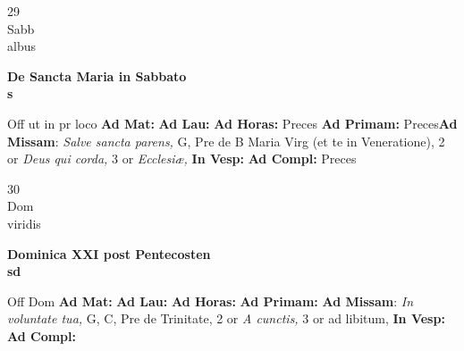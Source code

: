 \documentclass[10pt, openany]{book}
\begin{document}
        \begin{center}
            \begin{minipage}{3.5in}
                \vspace{2em}
                \begin{minipage}{0.5in}
                    {\Huge 29} \\
                    {\normalsize Sabb} \\
                    {\normalsize albus}
                \end{minipage}
                \begin{minipage}{3.0in}
                    \textbf{ \large De Sancta Maria in Sabbato \\
                    \textnormal{\normalsize s}} \\ 
                \end{minipage}
                \begin{justify}Off ut in pr loco
                    \textbf{Ad Mat: }
                    \textbf{Ad Lau: }
                    \textbf{Ad Horas: }Preces
                    \textbf{Ad Primam: }Preces\textbf{Ad Missam}: \textit{Salve sancta parens,} G, Pre de B Maria Virg (et te in Veneratione), 2 or \textit{Deus qui corda,} 3 or \textit{Ecclesiæ,}  
                    \textbf{In Vesp: }
                    \textbf{Ad Compl: }Preces
                \end{justify}
            \end{minipage}
        \end{center}
    
        \begin{center}
            \begin{minipage}{3.5in}
                \vspace{2em}
                \begin{minipage}{0.5in}
                    {\Huge 30} \\
                    {\normalsize Dom} \\
                    {\normalsize viridis}
                \end{minipage}
                \begin{minipage}{3.0in}
                    \textbf{ \large Dominica XXI post Pentecosten \\
                    \textnormal{\normalsize sd}} \\ 
                \end{minipage}
                \begin{justify}Off Dom
                    \textbf{Ad Mat: }
                    \textbf{Ad Lau: }
                    \textbf{Ad Horas: }
                    \textbf{Ad Primam: }\textbf{Ad Missam}: \textit{In voluntate tua,} G, C, Pre de Trinitate, 2 or \textit{A cunctis,} 3 or ad libitum,  
                    \textbf{In Vesp: }
                    \textbf{Ad Compl: }
                \end{justify}
            \end{minipage}
        \end{center}
    
\end{document}
